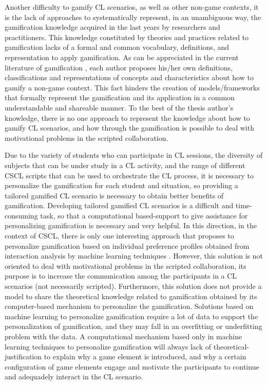 Another difficulty to gamify CL scenarios, as well as other non-game contexts, it is the lack of approaches to systematically represent, in an unambiguous way, the gamification knowledge acquired in the last years by researchers and practitioners.
This knowledge constituted by theories and practices related to gamification lacks of a formal and common vocabulary, definitions, and representation to apply gamification.
As can be appreciated in the current literature of gamification \cite{DichevaDichevAgreAngelova2015, HamariKoivistoSarsa2014, MoraRieraGonzalezArnedo-Moreno2015, SeabornFels2015}, each author proposes his/her own definitions, classifications and representations of concepts and characteristics about how to gamify a non-game context. This fact hinders the creation of models/frameworks that formally represent the gamification and its application in a common understandable and shareable manner.
To the best of the thesis author's knowledge, there is no one approach to represent the knowledge about how to gamify CL scenarios, and how through the gamification is possible to deal with motivational problems in the scripted collaboration.

Due to the variety of students who can participate in CL sessions, the diversity of subjects that can be under study in a CL activity, and the range of different CSCL scripts that can be used to orchestrate the CL process, it is necessary to personalize the gamification for each student and situation, so providing a tailored gamified CL scenario is necessary to obtain better benefits of gamification.
Developing tailored gamified CL scenarios is a difficult and time-consuming task, so that a computational based-support to give assistance for personalizing gamification is necessary and very helpful.
In this direction, in the context of CSCL, there is only one interesting approach that proposes to personalize gamification based on individual preference profiles obtained from interaction analysis by machine learning techniques \cite{KnutasvanRoyHynninenGranatoKasurinenIkonen2017,KnutasIkonenMaggioriniRipamontiPorras2016,KnutasIkonenNikulaPorras2014}.
However, this solution is not oriented to deal with motivational problems in the scripted collaboration, its purpose is to increase the communication among the participants in a CL scenarios (not necessarily scripted).
Furthermore, this solution does not provide a model to share the theoretical knowledge related to gamification obtained by its computer-based mechanism to personalize the gamification.
Solutions based on machine learning to personalize gamification require a lot of data to support the personalization of gamification, and they may fall in an overfitting or underfitting problem with the data.
A computational mechanism based only in machine learning techniques to personalize gamification will always lack of theoretical-justification to explain why a game element is introduced, and why a certain configuration of game elements engage and motivate the participants to continue and adequadely interact in the CL scenario.

